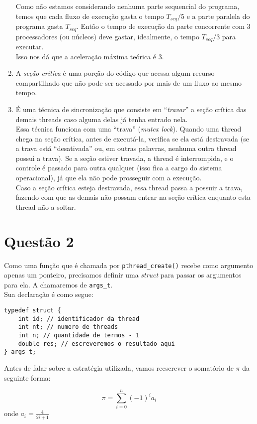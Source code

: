 \documentclass{article}
\begin{document}
\begin{enumerate}[label=\textbf{\alph*)}]
		Como não estamos considerando nenhuma parte sequencial do programa, temos que cada fluxo de execução
		gasta o tempo $T_{seq}/5$ e a parte paralela do programa gasta $T_{seq}$.
		Então o tempo de execução da parte concorrente com 3 processadores (ou núcleos) deve gastar, idealmente,
		o tempo $T_{seq}/3$ para executar.\\
		Isso nos dá que a aceleração máxima teórica é 3.
	\item A \emph{seção crítica} é uma porção do código que acessa algum recurso
		compartilhado que não pode ser acessado por mais de um fluxo ao mesmo tempo.
	\item É uma técnica de sincronização que consiste em ``\emph{travar}'' a seção crítica
		das demais threads caso alguma delas já tenha entrado nela.\\
		Essa técnica funciona com uma ``trava'' (\emph{mutex lock}). Quando uma thread
		chega na seção crítica, antes de executá-la, verifica se ela está destravada
		(se a trava está ``desativada'' ou, em outras palavras, nenhuma outra thread
		possui a trava). Se a seção estiver travada, a thread é interrompida, e o controle
		é passado para outra qualquer (isso fica a cargo do sistema operacional), já que
		ela não pode prosseguir com a execução.\\
		Caso a seção crítica esteja destravada, essa thread passa a possuir a trava, fazendo
		com que as demais não possam entrar na seção crítica enquanto esta thread não a soltar.
\end{enumerate}

\section*{Questão 2}

Como uma função que é chamada por \texttt{pthread\_create()} recebe como argumento apenas um ponteiro,
precisamos definir uma \emph{struct} para passar os argumentos para ela. A chamaremos de \texttt{args\_t}.\\
Sua declaração é como segue:

\begin{verbatim}
typedef struct {
	int id; // identificador da thread
	int nt; // numero de threads
	int n; // quantidade de termos - 1
	double res; // escreveremos o resultado aqui
} args_t;
\end{verbatim}

Antes de falar sobre a estratégia utilizada, vamos reescrever o somatório de $\pi$ da seguinte forma:
\begin{center}
	$$
	\pi = \sum_{i=0}^n{(-1)^ia_i} 
	$$
	onde $a_i = \frac{4}{2i+1}$
\end{center}
\end{document}
